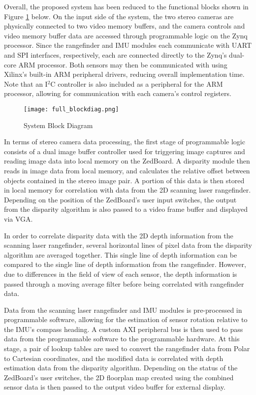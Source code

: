 Overall, the proposed system has been reduced to the functional blocks shown in Figure \ref{systemBD} below. On the input side of the system, the two stereo cameras are physically connected to two video memory buffers, and the camera controls and video memory buffer data are accessed through programmable logic on the Zynq processor.  Since the rangefinder and IMU modules each communicate with UART and SPI interfaces, respectively, each are connected directly to the Zynq's dual-core ARM processor. Both sensors may then be communicated with using Xilinx's built-in ARM peripheral drivers, reducing overall implementation time. Note that an I$^2$C controller is also included as a peripheral for the ARM processor, allowing for communication with each camera's control registers. 
\par
\begin{figure}[H] 
	\centerline{
	\texttt{[image: full\_blockdiag.png]}
	}
	\caption{System Block Diagram}
	\label{systemBD}
\end{figure}
\par
In terms of stereo camera data processing, the first stage of programmable logic consists of a dual image buffer controller used for triggering image captures and reading image data into local memory on the ZedBoard. A disparity module then reads in image data from local memory, and calculates the relative offset between objects contained in the stereo image pair. A portion of this data is then stored in local memory for correlation with data from the 2D scanning laser rangefinder. Depending on the position of the ZedBoard's user input switches, the output from the disparity algorithm is also passed to a video frame buffer and displayed via VGA. 
\par
In order to correlate disparity data with the 2D depth information from the scanning laser rangefinder, several horizontal lines of pixel data from the disparity algorithm are averaged together. This single line of depth information can be compared to the single line of depth information from the rangefinder. However, due to differences in the field of view of each sensor, the depth information is passed through a moving average filter before being correlated with rangefinder data. 
\par
Data from the scanning laser rangefinder and IMU modules is pre-processed in programmable software, allowing for the estimation of sensor rotation relative to the IMU's compass heading.  A custom AXI peripheral bus is then used to pass data from the programmable software to the programmable hardware. At this stage, a pair of lookup tables are used to convert the rangefinder data from Polar to Cartesian coordinates, and the modified data is correlated with depth estimation data from the disparity algorithm. Depending on the status of the ZedBoard's user switches, the 2D floorplan map created using the combined sensor data is then passed to the output video buffer for external display. 